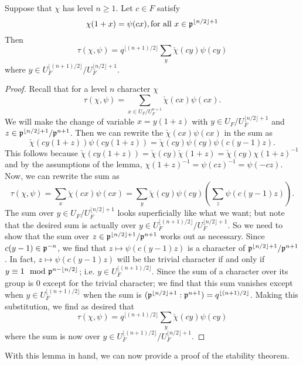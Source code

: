 \begin{lemma}\label{lem:Gauss-sum-reduction}
  Suppose that $\chi$ has level $n \geq 1$.
  Let $c \in F$ satisfy
  \[ \chi(1 +x) = \psi(cx), \textrm{for all } x\in \mathfrak{p}^{\lfloor n/2 \rfloor + 1}\]
  Then
  \[\tau(\chi, \psi) = q^{\lfloor (n+1)/2 \rfloor} \sum_y \check{\chi}(cy) \psi(cy)\]
  where $y \in U_F^{\lfloor (n+1)/2 \rfloor} / U_F^{\lfloor n/2 \rfloor + 1}$.
\end{lemma}

\begin{proof}
  Recall that for a level $n$ character $\chi$
  \[\tau(\chi, \psi) = \sum_{x \in U_F/U_F^{n+1}} \check{\chi}(cx) \psi(cx).\]
  We will make the change of variable $x = y(1+z)$ with $y \in U_F/U_F^{\lfloor n/2 \rfloor + 1}$ and $z \in \mathfrak{p}^{\lfloor n/2 \rfloor + 1}/\mathfrak{p}^{n+1}$. Then we can rewrite the $\check{\chi}(cx) \psi(cx)$ in the sum as
  \[\check{\chi}(cy(1+z))\psi(cy(1+z)) = \check{\chi}(cy)\psi(cy) \psi(c(y-1)z).\]
  This follows because $\check{\chi}(cy(1+z)) = \check{\chi}(cy) \check{\chi}(1+z) = \check{\chi}(cy)\chi(1+z)^{-1}$ and by the assumptions of the lemma, $\chi(1+z)^{-1} = \psi(cz)^{-1} = \psi(-cz)$.
  Now, we can rewrite the sum as
  \[\tau(\chi, \psi) = \sum_x \check{\chi}(cx) \psi(cx) = \sum_y \check{\chi}(cy) \psi(cy)\left( \sum_z \psi(c(y-1)z)\right).\]
  The sum over $y \in U_F/U_F^{\lfloor n/2 \rfloor +1}$ looks superficially like what we want; but note that the desired sum is actually over $y \in U_F^{\lfloor (n+1)/2 \rfloor} /U_F^{\lfloor n/2 \rfloor +1}$.
  So we need to show that the sum over $z \in \mathfrak{p}^{\lfloor n/2 \rfloor +1} / \mathfrak{p}^{n+1}$ works out as necessary.
  Since $c(y-1) \in \mathfrak{p}^{-n}$, we find that $z \mapsto \psi(c(y-1)z)$ is a character of $\mathfrak{p}^{\lfloor n/2 \rfloor +1}/\mathfrak{p}^{n+1}$.
  In fact, $z \mapsto \psi(c(y-1)z)$ will be the trivial character if and only if $y \equiv 1 \mod {\mathfrak{p}}^{n - \lfloor n/2 \rfloor}$; i.e. $y \in U_F^{\lfloor (n+1)/2\rfloor}$.
  Since the sum of a character over its group is $0$ except for the trivial character; we find that this sum vanishes except when $y \in U_F^{\lfloor (n+1)/2 \rfloor}$ when the sum is $(\mathfrak{p}^{\lfloor n/2 \rfloor +1} : \mathfrak{p}^{n+1}) = q^{\lfloor (n+1)/2 \rfloor}$.
  Making this substitution, we find as desired that
  \[ \tau(\chi, \psi) = q^{\lfloor (n+1)/2\rfloor} \sum_y \check{\chi}(cy) \psi(cy) \]
  where the sum is now over $y \in U_F^{\lfloor (n+1)/2 \rfloor} /U_F^{\lfloor n/2 \rfloor +1}$.
\end{proof}

With this lemma in hand, we can now provide a proof of the stability theorem.

